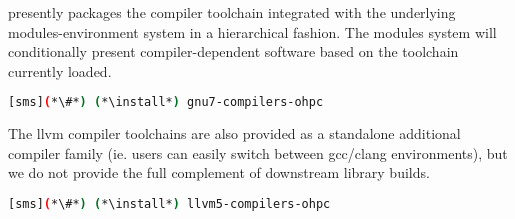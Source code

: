 \OHPC{} presently packages the \GNU{} compiler toolchain integrated with the 
underlying modules-environment system in a hierarchical fashion. The modules
system will conditionally present compiler-dependent software based on the
toolchain currently loaded. 

\begin{lstlisting}[language=bash]
[sms](*\#*) (*\install*) gnu7-compilers-ohpc
\end{lstlisting}

The llvm compiler toolchains are also provided as a standalone additional
compiler family (ie. users can easily switch between gcc/clang environments),
but we do not provide the full complement of downstream library builds.

\begin{lstlisting}[language=bash]
[sms](*\#*) (*\install*) llvm5-compilers-ohpc
\end{lstlisting}
